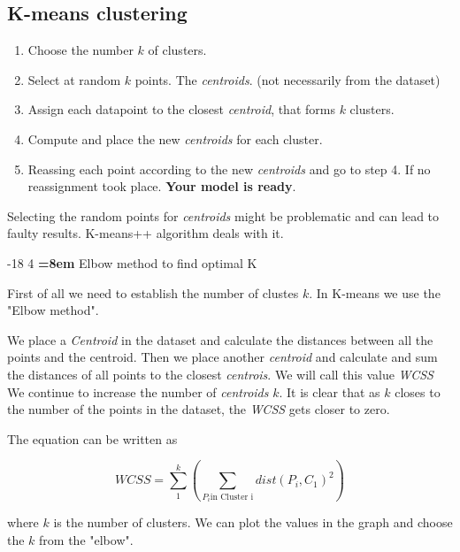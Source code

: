 \documentclass[runningheads,a4paper]{llncs}
\makeatletter
\renewcommand\subsubsection{\@startsection{subsubsection}{3}{\z@}%
                       {-18\p@ \@plus -4\p@ \@minus -4\p@}%
                       {4\p@ \@plus 2\p@ \@minus 2\p@}%
                       {\normalfont\normalsize\bfseries\boldmath
                        \rightskip=\z@ \@plus 8em\pretolerance=10000 }}
\makeatother
\begin{document}
\subsection{K-means clustering}

\begin{enumerate}
\item Choose the number $k$ of clusters.
\item Select at random $k$ points. The \textit{centroids}. (not necessarily from the dataset)
\item Assign each datapoint to the closest \textit{centroid}, that forms $k$ clusters.
\item Compute and place the new \textit{centroids} for each cluster.
\item Reassing each point according to the new \textit{centroids} and go to step 4. If no reassignment took place. \textbf{Your model is ready}.
\end{enumerate}

\bigskip

Selecting the random points for \textit{centroids} might be problematic and can lead to faulty results. K-means++ algorithm deals with it.

\subsubsection{Elbow method to find optimal K}

First of all we need to establish the number of clustes $k$. In K-means we use the "Elbow method".


We place a \textit{Centroid} in the dataset and calculate the distances between all the points and the centroid. Then we place another \textit{centroid} and calculate and sum the distances of all points to the closest \textit{centrois}. We will call this value \textit{WCSS} We continue to increase the number of \textit{centroids} $k$. It is clear that as $k$ closes to the number of the points in the dataset, the \textit{WCSS} gets closer to zero. 

The equation can be written as 

\begin{equation}
WCSS = \sum_{1}^{k} (\sum_{P_i \text{in Cluster i}} dist(P_i, C_1)^2)
\end{equation}

where $k$ is the number of clusters. We can plot the values in the graph and choose the $k$ from the "elbow".
\end{document}
